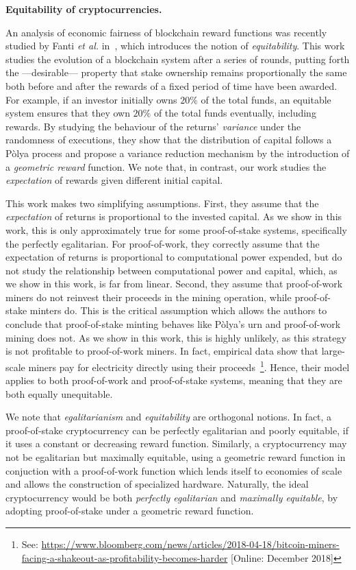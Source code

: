 
\textbf{Equitability of cryptocurrencies.}

An analysis of economic fairness of
blockchain reward functions was recently studied by Fanti \textit{et al.} in~\cite{fanti2018compounding}, which
introduces the notion of \emph{equitability}. This work studies the evolution
of a blockchain system after a series of rounds, putting forth the
---desirable--- property that stake ownership remains proportionally the same
both before and after the rewards of a fixed period of time have been awarded.
For example, if an
investor initially owns $20\%$ of the total funds, an equitable system ensures that they
own $20\%$ of the total funds eventually, \ie including
rewards. By studying the behaviour of the returns' \emph{variance} under the
randomness of executions, they show that the distribution of capital
follows a Pòlya process and propose a variance reduction mechanism
by the introduction of a \emph{geometric reward} function.
We note that, in contrast, our work studies the \emph{expectation} of rewards given different
initial capital.

This work makes two simplifying assumptions.
First, they assume that the \emph{expectation} of returns is proportional to the
invested capital. As we show in this work, this is only
approximately true for some proof-of-stake systems, specifically the perfectly egalitarian. For proof-of-work, they
correctly assume that the expectation of returns is proportional to computational
power expended, but do not study the relationship between computational power and
capital, which, as we show in this work, is far from linear. Second, they assume that
proof-of-work miners do not reinvest their proceeds in the
mining operation, while proof-of-stake minters do. This is the critical assumption which allows the authors to
conclude that proof-of-stake minting behaves like Pòlya's urn and
proof-of-work mining does not. As we show in this work, this
is highly unlikely, as this strategy is not profitable to proof-of-work
miners. In fact, empirical data show that large-scale miners pay for electricity
directly using their proceeds~\footnote{See:
\url{https://www.bloomberg.com/news/articles/2018-04-18/bitcoin-miners-facing-a-shakeout-as-profitability-becomes-harder}
[Online: December 2018]}. Hence, their model applies to both proof-of-work and
proof-of-stake systems, meaning that they are both equally unequitable.

We note that \emph{egalitarianism} and \emph{equitability} are orthogonal
notions. In fact, a proof-of-stake cryptocurrency can be perfectly egalitarian
and poorly equitable, \eg if it uses a constant or decreasing reward function.
Similarly, a cryptocurrency may not be egalitarian but maximally equitable, \eg
using a geometric reward function in conjuction with a proof-of-work function
which lends itself to economies of scale and allows the construction of
specialized hardware. Naturally, the ideal cryptocurrency would be both
\emph{perfectly egalitarian} and \emph{maximally equitable}, \eg by adopting
proof-of-stake under a geometric reward function.

